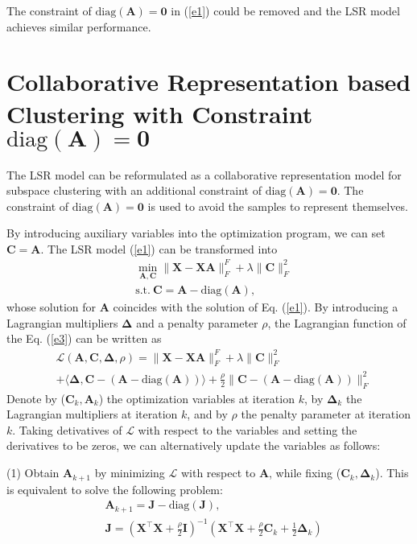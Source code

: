 \documentclass[10pt,twocolumn,letterpaper]{article}
\begin{document}
The constraint of  $\text{diag}(\bm{A})=\bm{0}$ in (\ref{e1}) could be removed and the LSR model achieves similar performance.


\section{Collaborative Representation based Clustering with Constraint $\text{diag}(\bm{A})=\bm{0}$}
The LSR model can be reformulated as a collaborative representation model \cite{crc} for subspace clustering with an additional constraint of $\text{diag}(\bm{A})=\bm{0}$. The constraint of $\text{diag}(\bm{A})=\bm{0}$ is used to avoid the samples to represent themselves.

By introducing auxiliary variables into the optimization program, we can set 
$
\bm{C}
=
\bm{A}
$.
The LSR model (\ref{e1}) can be transformed into
\begin{equation}
\begin{split}
\label{e5}
&
\min_{\bm{A},\bm{C}}
\|
\bm{X}
-
\bm{X}\bm{A}
\|_{F}^{F}
+
\lambda
\|
\bm{C}
\|_{F}^{2}
\\
& 
\text{s.t.}
\ 
\bm{C}=\bm{A}-\text{diag}(\bm{A})
,
\end{split}
\end{equation}
whose solution for $\bm{A}$ coincides with the solution of Eq. (\ref{e1}). By introducing a Lagrangian multipliers $\bm{\Delta}$ and a penalty parameter $\rho$, the Lagrangian function of the Eq. (\ref{e3}) can be written as
\begin{equation}
\begin{split}
\label{e6}
&
\mathcal{L}
(\bm{A},\bm{C},\bm{\Delta},\rho)
=
\|
\bm{X}
-
\bm{X}\bm{A}
\|_{F}^{F}
+
\lambda
\|
\bm{C}
\|_{F}^{2}
\\
&
+
\langle
\bm{\Delta},
\bm{C}-(\bm{A}-\text{diag}(\bm{A}))
\rangle
+
\frac{\rho}{2}
\|
\bm{C}-(\bm{A}-\text{diag}(\bm{A}))
\|_{F}^{2}
\end{split}
\end{equation}
Denote by ($\bm{C}_{k},\bm{A}_{k}$) the optimization variables at iteration $k$, by $\bm{\Delta}_{k}$ the Lagrangian multipliers at iteration $k$, and by $\rho$ the penalty parameter at iteration $k$. Taking detivatives of $\mathcal{L}$ with respect to the variables and setting the derivatives to be zeros, we can alternatively update the variables as follows:

(1) Obtain $\bm{A}_{k+1}$ by minimizing $\mathcal{L}$ with respect to $\bm{A}$, while fixing ($\bm{C}_{k},\bm{\Delta}_{k}$). This is equivalent to solve the following problem:
\begin{equation}
\begin{split}
\label{e7}
&
\bm{A}_{k+1}
=
\bm{J}-\text{diag}(\bm{J}),
\\
&
\bm{J}
=
(\bm{X}^{\top}\bm{X}+\frac{\rho}{2}\bm{I})^{-1}
(\bm{X}^{\top}\bm{X}+\frac{\rho}{2}\bm{C}_{k}+\frac{1}{2}\bm{\Delta}_{k})
\end{split}
\end{equation}
\end{document}
